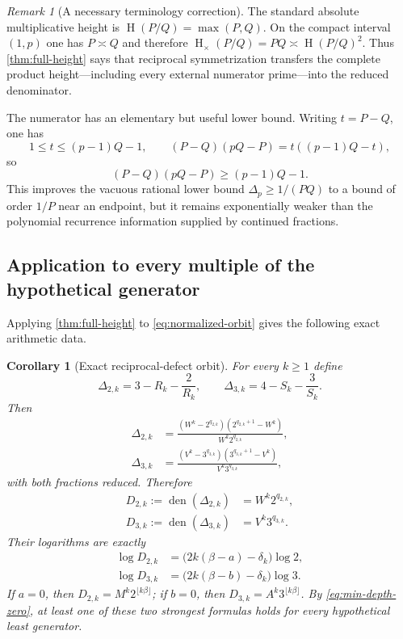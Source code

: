 \documentclass[11pt]{article}
\newtheorem{corollary}[theorem]{Corollary}
\theoremstyle{definition}
\theoremstyle{remark}
\newtheorem{remark}[theorem]{Remark}
\newcommand{\den}{\operatorname{den}}
\newcommand{\htn}{\operatorname{H}}
\newcommand{\Htimes}{\operatorname{H}_{\!\times}}
\begin{document}
\begin{remark}[A necessary terminology correction]
The standard absolute multiplicative height is $\htn(P/Q)=\max(P,Q)$.  On the compact interval $(1,p)$ one has $P\asymp Q$ and therefore $\Htimes(P/Q)=PQ\asymp\htn(P/Q)^2$.  Thus \cref{thm:full-height} says that reciprocal symmetrization transfers the complete product height---including every external numerator prime---into the reduced denominator.
\end{remark}

The numerator has an elementary but useful lower bound.  Writing $t=P-Q$, one has
\[
 1\le t\le(p-1)Q-1,
 \qquad
 (P-Q)(pQ-P)=t((p-1)Q-t),
\]
so
\begin{equation}\label{eq:numer-lower}
 (P-Q)(pQ-P)\ge(p-1)Q-1.
\end{equation}
This improves the vacuous rational lower bound $\Delta_p\ge1/(PQ)$ to a bound of order $1/P$ near an endpoint, but it remains exponentially weaker than the polynomial recurrence information supplied by continued fractions.

\subsection{Application to every multiple of the hypothetical generator}

Applying \cref{thm:full-height} to \eqref{eq:normalized-orbit} gives the following exact arithmetic data.

\begin{corollary}[Exact reciprocal-defect orbit]\label{cor:defect-orbit}
For every $k\ge1$ define
\begin{equation}\label{eq:Deltapk}
 \Delta_{2,k}=3-R_k-\frac2{R_k},
 \qquad
 \Delta_{3,k}=4-S_k-\frac3{S_k}.
\end{equation}
Then
\begin{align}
 \Delta_{2,k}
 &=\frac{(W^k-2^{q_{2,k}})(2^{q_{2,k}+1}-W^k)}
 {W^k2^{q_{2,k}}},\label{eq:D2exact}\\
 \Delta_{3,k}
 &=\frac{(V^k-3^{q_{3,k}})(3^{q_{3,k}+1}-V^k)}
 {V^k3^{q_{3,k}}},\label{eq:D3exact}
\end{align}
with both fractions reduced.  Therefore
\begin{align}
 D_{2,k}:=\den(\Delta_{2,k})&=W^k2^{q_{2,k}},\label{eq:D2den}\\
 D_{3,k}:=\den(\Delta_{3,k})&=V^k3^{q_{3,k}}.\label{eq:D3den}
\end{align}
Their logarithms are exactly
\begin{align}
 \log D_{2,k}&=\bigl(2k(\beta-a)-\delta_k\bigr)\log2,\label{eq:D2log}\\
 \log D_{3,k}&=\bigl(2k(\beta-b)-\delta_k\bigr)\log3.\label{eq:D3log}
\end{align}
If $a=0$, then $D_{2,k}=M^k2^{\lfloor k\beta\rfloor}$; if $b=0$, then $D_{3,k}=A^k3^{\lfloor k\beta\rfloor}$.  By \eqref{eq:min-depth-zero}, at least one of these two strongest formulas holds for every hypothetical least generator.
\end{corollary}
\end{document}
